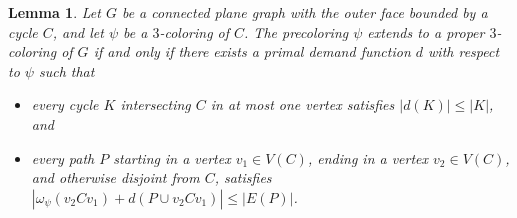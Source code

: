 \documentclass[12pt,twoside,openright,a4paper]{book}
\newtheorem{lemma}[theorem]{Lemma}
\begin{document}
\begin{lemma}\label{lemma:flow-quadr-better}
Let $G$ be a connected plane graph with the outer face bounded by a cycle $C$, and let $\psi$ be a $3$-coloring of $C$.
The precoloring $\psi$ extends to a proper $3$-coloring of $G$ if and only if there exists a primal demand function $d$
with respect to $\psi$ such that
\begin{itemize}
\item[(i)] every cycle $K$ intersecting $C$ in at most one vertex satisfies $|d(K)|\le |K|$, and
\item[(ii)] every path $P$ starting in a vertex $v_1\in V(C)$, ending in a vertex $v_2\in V(C)$,
and otherwise disjoint from $C$, satisfies $|\omega_\psi(v_2Cv_1)+d(P\cup v_2Cv_1)|\le |E(P)|$.
\end{itemize}
\end{lemma}
\end{document}
